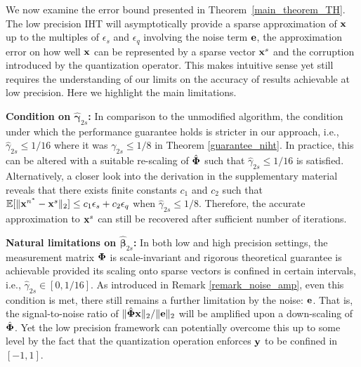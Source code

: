 \documentclass{article}
\begin{document}
We now examine the error bound presented in Theorem~\ref{main_theorem_TH}. The low precision IHT will asymptotically provide a sparse approximation of ${\bf x}$ up to the multiples of $\epsilon_s$ and $\epsilon_q$ involving the noise term ${\bf e}$, the approximation error on how well ${\bf x}$ can be represented by a sparse vector ${\bf x}^s$ and the corruption introduced by the quantization operator. This makes intuitive sense yet still requires the understanding of our limits on the accuracy of results achievable at low precision. Here we highlight the main limitations.

{\bf Condition on $\hat{\boldsymbol{\gamma}}_{2s}$:} In comparison to the unmodified algorithm, the condition under which the performance guarantee holds is stricter in our approach, i.e., $\hat{\gamma}_{2s}\leq 1/16$ where it was ${\gamma}_{2s}\leq 1/8$ in Theorem \ref{guarantee_niht}. In practice, this can be altered with a suitable re-scaling of $\hat{\bf \Phi}$ such that $\hat{\gamma}_{2s}\leq 1/16$ is satisfied. Alternatively, a closer look into the derivation in the supplementary material reveals that there exists finite constants $c_1$ and $c_2$ such that $\mathbb{E}[\|{\bf x}^{n^*}-{\bf x}^s \|_2] \leq c_1\epsilon_s + c_2\epsilon_q$ when $\hat{\gamma}_{2s}\leq 1/8$. Therefore, the accurate approximation to ${\bf x}^s$ can still be recovered after sufficient number of iterations.


{\bf Natural limitations on $\hat{\boldsymbol{\beta}}_{2s}$:} In both low and high precision settings, the measurement matrix ${\bf \Phi}$ is scale-invariant and rigorous theoretical guarantee is achievable provided its scaling onto sparse vectors is confined in certain intervals, i.e., $\hat{\gamma}_{2s}\in [0, 1/16]$. As introduced in Remark \ref{remark_noise_amp}, even this condition is met, there still remains a further limitation by the noise: ${\bf e}$. That is, the signal-to-noise ratio of $\|\hat{\bf \Phi} {\bf x} \|_2/\|{\bf e} \|_2$ will be amplified upon a down-scaling of $\hat{\bf \Phi}$. Yet the low precision framework can potentially overcome this up to some level by the fact that the quantization operation enforces ${\bf y}$ to be confined in $[-1, 1]$.
\end{document}
